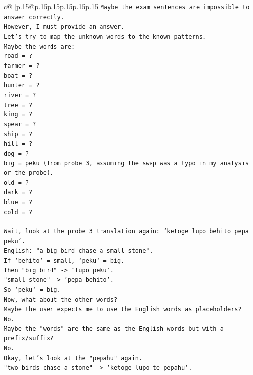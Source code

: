 \documentclass{article}
\begin{document}
{\begin{supertabular}{c@{$\;$}|p{.15\linewidth}@{}p{.15\linewidth}p{.15\linewidth}p{.15\linewidth}p{.15\linewidth}p{.15\linewidth}}
{{{\texttt{Maybe the exam sentences are impossible to answer correctly.} \\
\texttt{However, I must provide an answer.} \\
\texttt{Let's try to map the unknown words to the known patterns.} \\
\texttt{Maybe the words are:} \\
\texttt{road = ?} \\
\texttt{farmer = ?} \\
\texttt{boat = ?} \\
\texttt{hunter = ?} \\
\texttt{river = ?} \\
\texttt{tree = ?} \\
\texttt{king = ?} \\
\texttt{spear = ?} \\
\texttt{ship = ?} \\
\texttt{hill = ?} \\
\texttt{dog = ?} \\
\texttt{big = peku (from probe 3, assuming the swap was a typo in my analysis or the probe).} \\
\texttt{old = ?} \\
\texttt{dark = ?} \\
\texttt{blue = ?} \\
\texttt{cold = ?} \\
\\ 
\texttt{Wait, look at the probe 3 translation again: `ketoge lupo behito pepa peku`.} \\
\texttt{English: "a big bird chase a small stone".} \\
\texttt{If `behito` = small, `peku` = big.} \\
\texttt{Then "big bird" {-}> `lupo peku`.} \\
\texttt{"small stone" {-}> `pepa behito`.} \\
\texttt{So `peku` = big.} \\
\texttt{Now, what about the other words?} \\
\texttt{Maybe the user expects me to use the English words as placeholders? No.} \\
\texttt{Maybe the "words" are the same as the English words but with a prefix/suffix?} \\
\texttt{No.} \\
\texttt{Okay, let's look at the "pepahu" again.} \\
\texttt{"two birds chase a stone" {-}> `ketoge lupo te pepahu`.} \\
}}}
\end{supertabular}}
\end{document}

